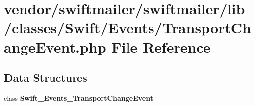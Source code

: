 \section{vendor/swiftmailer/swiftmailer/lib/classes/\+Swift/\+Events/\+Transport\+Change\+Event.php File Reference}
\label{_transport_change_event_8php}
\subsection*{Data Structures}
\begin{DoxyCompactItemize}
\item 
class {\bf Swift\+\_\+\+Events\+\_\+\+Transport\+Change\+Event}
\end{DoxyCompactItemize}
